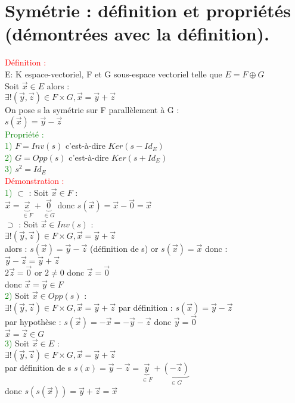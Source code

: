 \documentclass{article}
\begin{document}
\section{Symétrie : définition et propriétés (démontrées avec la définition).}
\textcolor{red}{Définition :} \\ 
E: K espace-vectoriel, F et G sous-espace vectoriel telle que $E= F \oplus G$ \\ 
Soit $\vec{x} \in E$ alors : \\ 
$\exists!(\vec{y},\vec{z}) \in F \times G, \vec{x}=\vec{y}+ \vec{z}$ \\ 
On pose s la symétrie sur F parallèlement à G : \\
$s(\vec{x})=\vec{y}-\vec{z}$ \\ 
\textcolor{green}{Propriété :} \\ 
\textcolor{green}{1)} $F=Inv(s)$ c'est-à-dire $Ker(s-Id_E)$ \\ 
\textcolor{green}{2)} $G=Opp(s)$ c'est-à-dire $Ker (s+Id_E)$ \\ 
\textcolor{green}{3)} $s^2=Id_E$ \\ 
\textcolor{red}{Démonstration :} \\ 
\textcolor{green}{1)} $\subset$ : Soit $\vec{x} \in F$ : \\ 
$\vec{x}=\underbrace{\vec{x}}_{\in F}+\underbrace{\vec{0}}_{\in G}$ donc $s(\vec{x})= \vec{x}-\vec{0}=\vec{x}$ \\ 
$\supset$ : Soit $\vec{x} \in Inv(s)$ : \\ 
$\exists!(\vec{y},\vec{z}) \in F \times G, \vec{x}=\vec{y}+ \vec{z}$ \\ 
alors : $s(\vec{x})= \vec{y}-\vec{z}$ (définition de s) or $s(\vec{x})=\vec{x}$ donc : \\ 
$\vec{y}-\vec{z}=\vec{y}+\vec{z}$ \\ 
$2 \vec{z}= \vec{0}$ or $2 \neq 0$ donc $\vec{z}=\vec{0}$ \\ 
donc $\vec{x}=\vec{y} \in F$ \\ 
\textcolor{green}{2)} Soit $\vec{x} \in Opp(s)$ : \\ 
$\exists!(\vec{y},\vec{z}) \in F \times G, \vec{x}=\vec{y}+ \vec{z}$
par définition : $s(\vec{x})=\vec{y}-\vec{z}$ \\ 
par hypothèse : $s(\vec{x})=-\vec{x}=- \vec{y} -\vec{z}$ donc $\vec{y} =\vec{0}$ \\ 
$\vec{x}=\vec{z} \in G$ \\ 
\textcolor{green}{3)} Soit $\vec{x} \in E$ : \\ 
$\exists!(\vec{y},\vec{z}) \in F \times G, \vec{x}=\vec{y}+ \vec{z}$ \\ 
par définition de s $s(x)= \vec{y}- \vec{z}=\underbrace{\vec{y}}_{\in F}+ \underbrace{(-\vec{z})}_{\in G}$ \\ 
donc $s(s(\vec{x}))= \vec{y}+ \vec{z}=\vec{x}$
\end{document}
